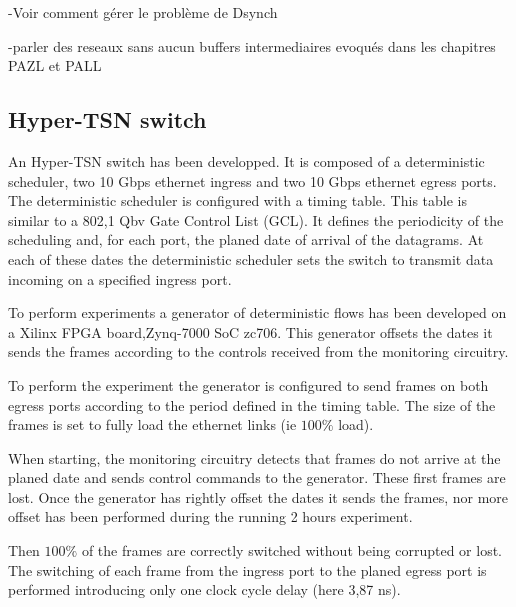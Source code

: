 -Voir comment gérer le problème de Dsynch

-parler des reseaux sans aucun buffers intermediaires evoqués dans les chapitres PAZL et PALL
\subsection{Hyper-TSN switch}

An Hyper-TSN switch has been developped. It is composed of a deterministic scheduler, two 10 Gbps ethernet ingress and two 10 Gbps ethernet egress ports. The deterministic scheduler is configured with a timing table. This table is similar to a 802,1 Qbv Gate Control List (GCL). It defines the periodicity of the scheduling and, for each port, the planed date of arrival of the datagrams. At each of these dates the deterministic scheduler sets the switch to transmit data incoming on a specified ingress port.

To perform experiments a generator of deterministic flows has been developed on a Xilinx FPGA board,Zynq-7000 SoC zc706. This generator offsets the dates it sends the frames according to the controls received from the monitoring circuitry.

To perform the experiment the generator is configured to send frames on both egress ports according to the period defined in the timing table. The size of the frames is set to fully load the ethernet links (ie $100\%$ load).

When starting, the monitoring circuitry detects that frames do not arrive at the planed date and sends control commands to the generator. These first frames are lost. Once the generator has rightly offset the dates it sends the frames, nor more offset has been performed during the running 2 hours experiment.

Then $100\%$ of the frames are correctly switched without being corrupted or lost. The switching of each frame from the ingress port to the planed egress port is performed introducing only one clock cycle delay (here 3,87 ns).
